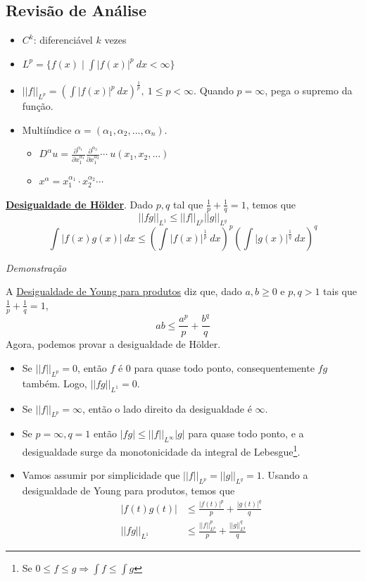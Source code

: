 \documentclass[11pt]{article}
\newcommand{\norm}[2]{\left|\left|#1\right|\right|_{L^{#2}}}
\begin{document}
\subsection{Revisão de Análise}
\begin{itemize}
	\item \(C^k\): diferenciável \(k\) vezes
	\item \(L^p = \{ f(x) \mid \int |f(x)|^p \ dx < \infty \}\)
	\item \(||f||_{L^p}= \left( \int |f(x)|^p\ dx \right)^\frac{1}{p}, \ 1\leq p < \infty\). Quando \(p=\infty\), pega o supremo da função.
	\item Multiíndice \(\alpha = (\alpha_1, \alpha_2, ..., \alpha_n)\).
	\begin{itemize}
		\item \(D^\alpha u = \frac{\partial^{\alpha_1}}{\partial x_1^{\alpha_1}}\frac{\partial^{\alpha_2}}{\partial x_1^{\alpha_2}}\cdots\ u(x_1, x_2, \ldots)\)
		\item \(x^\alpha = x_1^{\alpha_1}\cdot x_2^{\alpha_2} \cdots \)
	\end{itemize}
\end{itemize}

\href{https://en.wikipedia.org/wiki/H\%C3\%B6lder\%27s_inequality}{\textbf{Desigualdade de Hölder}}. Dado \(p,q\) tal que \(\frac{1}{p} + \frac{1}{q} = 1\), temos que
\begin{equation}\label{holder}
	||fg||_{L^1} \leq ||f||_{L^p} ||g||_{L^q} 
\end{equation} 
\[ \int |f(x)g(x)|\ dx \leq \left( \int |f(x)|^\frac{1}{p}\ dx \right)^p \left( \int |g(x)|^\frac{1}{q}\ dx \right)^q \]

\textit{Demonstração}

A \href{https://en.wikipedia.org/wiki/Young\%27s_inequality_for_products}{Desigualdade de Young para produtos} diz que, dado \( a,b\geq 0 \) e \( p, q>1 \) tais que \( \frac{1}{p}  + \frac{1}{q} = 1\), \[ab \leq \frac{a^p}{p} + \frac{b^q}{q}\]Agora, podemos provar a desigualdade de Hölder.
\begin{itemize}
	\item Se \( \norm{f}{p} = 0\), então \( f \) é 0 para quase todo ponto, consequentemente \( fg \) também. Logo, \( \norm{fg}{1} = 0 \).
	\item Se \( \norm{f}{p} = \infty \), então o lado direito da desigualdade é \( \infty \).
	\item Se \( p=\infty, q=1 \) então \( |fg|\leq \norm{f}{\infty} |g| \) para quase todo ponto, e a desigualdade surge da monotonicidade da integral de Lebesgue\footnote{Se \( 0\leq f \leq g \Rightarrow \int f \leq \int g \)}.
	\item Vamos assumir por simplicidade que \( \norm{f}{p} = \norm{g}{q} = 1\). Usando a desigualdade de Young para produtos, temos que \begin{align*}
		|f(t)g(t)| &\leq \frac{|f(t)|^p}{p} +\frac{|g(t)|^q}{q} \\
		\norm{fg}{1} &\leq \frac{\norm{f}{p}^p}{p} + \frac{\norm{g}{q}^q}{q}
	\end{align*}
	
\end{itemize}
\end{document}
